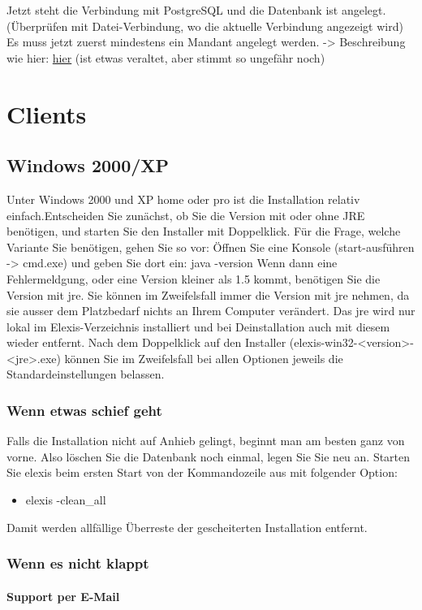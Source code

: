 Jetzt steht die Verbindung mit PostgreSQL und die Datenbank ist angelegt. (Überprüfen mit Datei-Verbindung, wo die aktuelle Verbindung angezeigt wird)
Es muss jetzt zuerst mindestens ein Mandant angelegt werden.
-{>} Beschreibung wie hier: \href{http://www.elexis.ch/jp/content/view/51/47/}{hier}
(ist etwas veraltet, aber stimmt so ungefähr noch)

\chapter{Clients}
\section{Windows 2000/XP}
Unter Windows 2000 und XP home oder pro ist die Installation relativ einfach.Entscheiden Sie zunächst, ob Sie die Version mit oder ohne JRE benötigen, und starten Sie den Installer mit Doppelklick.
Für die Frage, welche Variante Sie benötigen, gehen Sie so vor:
Öffnen Sie eine Konsole (start-ausführen -> cmd.exe) und geben Sie dort ein:
java -version
Wenn dann eine Fehlermeldgung, oder eine Version kleiner als 1.5 kommt, benötigen Sie die Version mit jre.
Sie können im Zweifelsfall immer die Version mit jre nehmen, da sie ausser dem Platzbedarf nichts an Ihrem Computer verändert. Das jre wird nur lokal im Elexis-Verzeichnis installiert und bei Deinstallation auch mit diesem wieder entfernt.
Nach dem Doppelklick auf den Installer (elexis-win32-<version>-<jre>.exe) können Sie im Zweifelsfall bei allen Optionen jeweils die Standardeinstellungen belassen.
\subsection{Wenn etwas schief geht}
Falls die Installation nicht auf Anhieb gelingt, beginnt man am besten ganz von vorne. Also löschen Sie die Datenbank noch einmal, legen Sie Sie neu an. Starten Sie elexis beim ersten Start von der Kommandozeile aus mit folgender Option:
\begin{itemize}
\item elexis -clean\_all
\end{itemize}


Damit werden allfällige Überreste der gescheiterten Installation entfernt.
\subsection{Wenn es nicht klappt}
\subsubsection{Support per E-Mail}

